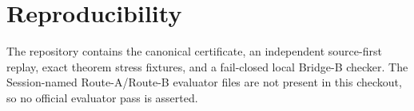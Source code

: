 \documentclass[11pt]{article}
\begin{document}
\section*{Reproducibility}

The repository contains the canonical certificate, an independent
source-first replay, exact theorem stress fixtures, and a fail-closed local
Bridge-B checker.  The Session-named Route-A/Route-B evaluator files are not
present in this checkout, so no official evaluator pass is asserted.



\end{document}
